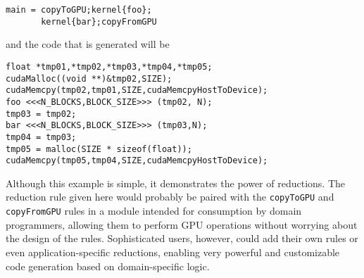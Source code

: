 \begin{verbatim}
main = copyToGPU;kernel{foo};
       kernel{bar};copyFromGPU
\end{verbatim}

and the code that is generated will be

\begin{verbatim}
float *tmp01,*tmp02,*tmp03,*tmp04,*tmp05;
cudaMalloc((void **)&tmp02,SIZE);
cudaMemcpy(tmp02,tmp01,SIZE,cudaMemcpyHostToDevice);
foo <<<N_BLOCKS,BLOCK_SIZE>>> (tmp02, N);
tmp03 = tmp02;
bar <<<N_BLOCKS,BLOCK_SIZE>>> (tmp03,N);
tmp04 = tmp03;
tmp05 = malloc(SIZE * sizeof(float));
cudaMemcpy(tmp05,tmp04,SIZE,cudaMemcpyHostToDevice);
\end{verbatim}

Although this example is simple, it demonstrates the power of reductions. The reduction rule given here would probably be paired with the \texttt{copyToGPU} and \texttt{copyFromGPU} rules in a module intended for consumption by domain programmers, allowing them to perform GPU operations without worrying about the design of the rules. Sophisticated users, however, could add their own rules or even application-specific reductions, enabling very powerful and customizable code generation based on domain-specific logic.
